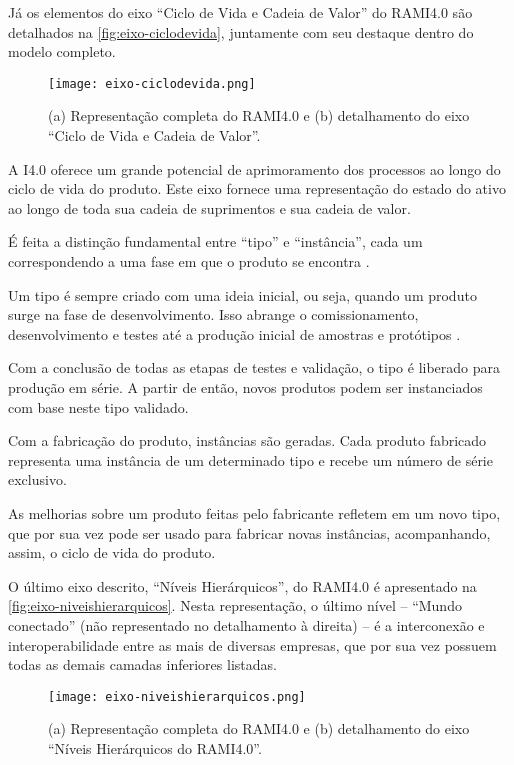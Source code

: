 	Já os elementos do eixo ``Ciclo de Vida e Cadeia de Valor'' do RAMI4.0 são detalhados na \autoref{fig:eixo-ciclodevida}, juntamente com seu destaque dentro do modelo completo.
	
	\begin{figure}[htb]
		\centering
		\label{fig:eixo-ciclodevida}
		\texttt{[image: eixo-ciclodevida.png]}
		\caption{(a) Representação completa do RAMI4.0 e (b) detalhamento do eixo ``Ciclo de Vida e Cadeia de Valor''.}
	\end{figure}

	A I4.0 oferece um grande potencial de aprimoramento dos processos ao longo do ciclo de vida do produto. Este eixo fornece uma representação do estado do ativo ao longo de toda sua cadeia de suprimentos e sua cadeia de valor. 
	
	É feita a distinção fundamental entre ``tipo'' e ``instância'', cada um correspondendo a uma fase em que o produto se encontra \cite{adolphs2015rami}.
	
	Um tipo é sempre criado com uma ideia inicial, ou seja, quando um produto surge na fase de desenvolvimento. Isso abrange o comissionamento, desenvolvimento e testes até a produção inicial de amostras e protótipos \cite{adolph2018roadmap}. 
	
	Com a conclusão de todas as etapas de testes e validação, o tipo é liberado para produção em série. A partir de então, novos produtos podem ser instanciados com base neste tipo validado. 
	
	Com a fabricação do produto, instâncias são geradas. Cada produto fabricado representa uma instância de um determinado tipo e recebe um número de série exclusivo.
	
	As melhorias sobre um produto feitas pelo fabricante refletem em um novo tipo, que por sua vez pode ser usado para fabricar novas instâncias, acompanhando, assim, o ciclo de vida do produto.

	O último eixo descrito, ``Níveis Hierárquicos'', do RAMI4.0 é apresentado na \autoref{fig:eixo-niveishierarquicos}. Nesta representação, o último nível -- ``Mundo conectado'' (não representado no detalhamento à direita) -- é a interconexão e interoperabilidade entre as mais de diversas empresas, que por sua vez possuem todas as demais camadas inferiores listadas.
	
	\begin{figure}[htb]
		\centering
		\label{fig:eixo-niveishierarquicos}
		\texttt{[image: eixo-niveishierarquicos.png]}
		\caption{(a) Representação completa do RAMI4.0 e (b) detalhamento do eixo ``Níveis Hierárquicos do RAMI4.0''.}
	\end{figure}

